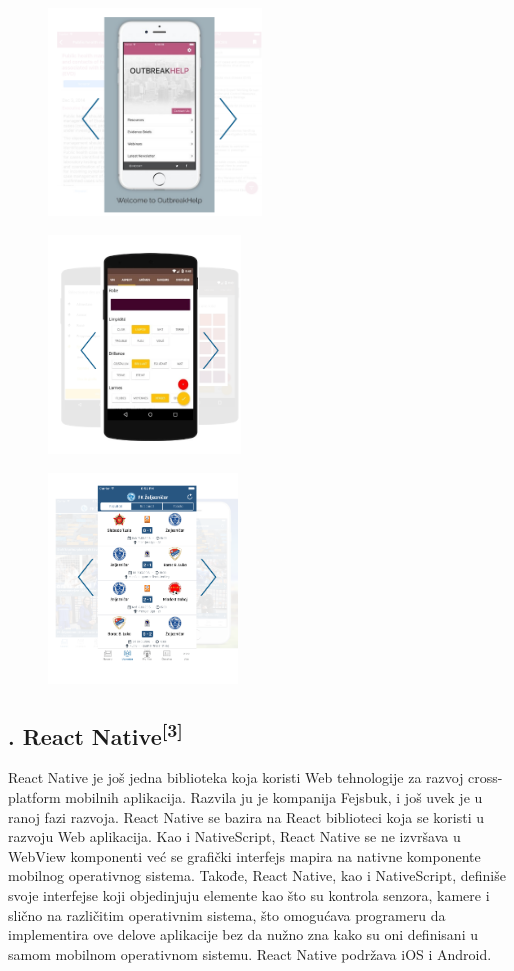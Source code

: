 \documentclass[a4paper]{article}
\begin{document}
\begin{figure}
\centering
\includegraphics[width=56.55mm,height=55.1mm]{msc-img4.png}
\end{figure}
\begin{figure}
\centering
\includegraphics[width=51.01mm,height=58mm]{msc-img5.png}
\end{figure}
\begin{figure}
\centering
\includegraphics[width=50.39mm,height=55.81mm]{msc-img6.png}
\end{figure}
\subsection[2.3. React Native[3{]}]{. React
Native\textsuperscript{[3]}}
\hypertarget{RefHeadingToc871882405265}{}React Native je još jedna
biblioteka koja koristi Web tehnologije za razvoj cross-platform
mobilnih aplikacija. Razvila ju je kompanija Fejsbuk, i još uvek je u
ranoj fazi razvoja. React Native se bazira na React biblioteci koja se
koristi u razvoju Web aplikacija. Kao i NativeScript, React Native se
ne izvršava u WebView komponenti već se grafički interfejs mapira na
nativne komponente mobilnog operativnog sistema. Takođe, React Native,
kao i NativeScript, definiše svoje interfejse koji objedinjuju elemente
kao što su kontrola senzora, kamere i slično na različitim operativnim
sistema, što omogućava programeru da implementira ove delove aplikacije
bez da nužno zna kako su oni definisani u samom mobilnom operativnom
sistemu. React Native podržava iOS i Android.
\end{document}
